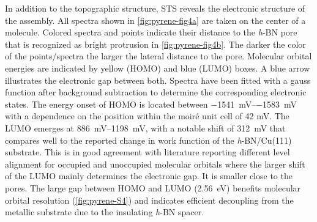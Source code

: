 In addition to the topographic structure, STS reveals the electronic structure of the assembly. All spectra shown in \autoref{fig:pyrene-fig4a} are taken on the center of a molecule. Colored spectra and points indicate their distance to the \textit{h}-BN pore that is recognized as bright protrusion in \autoref{fig:pyrene-fig4b}. The darker the color of the points/spectra the larger the lateral distance to the pore. Molecular orbital energies are indicated by yellow (HOMO) and blue (LUMO) boxes. A blue arrow illustrates the electronic gap between both. Spectra have been fitted with a gauss function after background subtraction to determine the corresponding electronic states. The energy onset of HOMO is located between \SIrange{-1541}{-1583}{\milli \volt} with a dependence on the position within the moir\'e unit cell of 42 mV. The LUMO emerges at \SIrange{886}{1198}{\milli \volt}, with a notable shift of \SI{312}{\milli \volt} that compares well to the reported change in work function of the \textit{h}-BN/Cu(111) substrate.\cite{Sushobhan_Control_2014,Liu_Interplay_2015,Schulz_Templated_2013,urgel_controlling_2015} This is in good agreement with literature reporting different level alignment for occupied and unoccupied molecular orbitals where the larger shift of the LUMO mainly determines the electronic gap. It is smaller close to the pores.\cite{Kumar_Molecular_2017} The large gap between HOMO and LUMO (\SI{2.56}{\eV}) benefits molecular orbital resolution (\autoref{fig:pyrene-S4}) and indicates efficient decoupling from the metallic substrate due to the insulating \textit{h}-BN spacer. 

